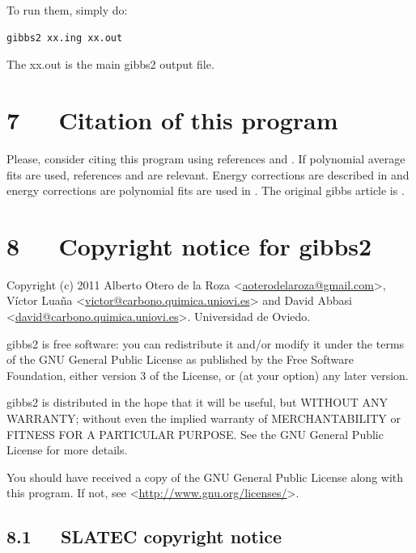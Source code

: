 \documentclass[a4paper]{article}
\begin{document}
To run them, simply do:
%
\asciilist
\begin{lstlisting}
gibbs2 xx.ing xx.out
\end{lstlisting}

The xx.out is the main gibbs2 output file.


\section{7~~~Citation of this program%
  \label{citation-of-this-program}%
}

Please, consider citing this program using references \cite{fit1} and
\cite{impl} . If polynomial average fits are used, references \cite{fit1} and
\cite{fit2} are relevant. Energy corrections are described in \cite{corr} and
energy corrections are polynomial fits are used in \cite{rig} . The
original gibbs article is \cite{orig}.


\section{8~~~Copyright notice for gibbs2%
  \label{copyright-notice-for-gibbs2}%
}

Copyright (c) 2011 Alberto Otero de la Roza <\href{mailto:aoterodelaroza@gmail.com}{aoterodelaroza@gmail.com}>,
Víctor Luaña <\href{mailto:victor@carbono.quimica.uniovi.es}{victor@carbono.quimica.uniovi.es}> and David
Abbasi <\href{mailto:david@carbono.quimica.uniovi.es}{david@carbono.quimica.uniovi.es}>. Universidad de Oviedo.

gibbs2 is free software: you can redistribute it and/or modify
it under the terms of the GNU General Public License as published by
the Free Software Foundation, either version 3 of the License, or (at
your option) any later version.

gibbs2 is distributed in the hope that it will be useful,
but WITHOUT ANY WARRANTY; without even the implied warranty of
MERCHANTABILITY or FITNESS FOR A PARTICULAR PURPOSE.  See the
GNU General Public License for more details.

You should have received a copy of the GNU General Public License
along with this program.  If not, see <\url{http://www.gnu.org/licenses/}>.


\subsection{8.1~~~SLATEC copyright notice%
  \label{slatec-copyright-notice}%
}
\end{document}

